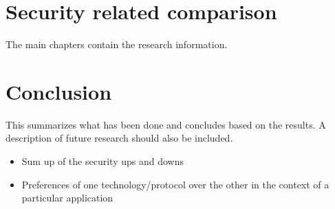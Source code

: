 \documentclass[conference]{IEEEtran}
\begin{document}
\section{Security related comparison}

The main chapters contain the research information.

\section{Conclusion}

This summarizes what has been done and concludes based on the results. A description of future research should also be included.  

\begin{itemize}
	\item Sum up of the security ups and downs
	\item Preferences of one technology/protocol over the other in the
		context of a particular application
\end{itemize}




\nocite{*}
\printbibliography

\end{document}
